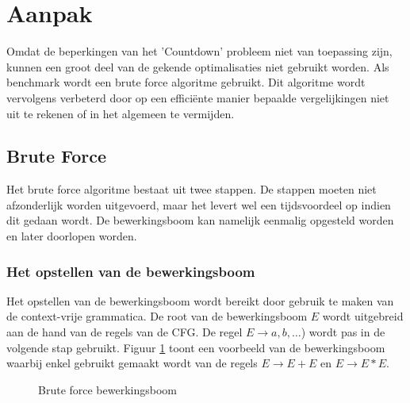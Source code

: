 \documentclass[Main.tex]{subfiles}
\begin{document}
\section{Aanpak}
Omdat de beperkingen van het 'Countdown' probleem niet van toepassing zijn, kunnen een groot deel van de gekende optimalisaties niet gebruikt worden. Als benchmark wordt een brute force algoritme gebruikt. Dit algoritme wordt vervolgens verbeterd door op een effici\"ente manier bepaalde vergelijkingen niet uit te rekenen of in het algemeen te vermijden.
\subsection{Brute Force}
Het brute force algoritme bestaat uit twee stappen. De stappen moeten niet afzonderlijk worden uitgevoerd, maar het levert wel een tijdsvoordeel op indien dit gedaan wordt. De bewerkingsboom kan namelijk eenmalig opgesteld worden en later doorlopen worden.
\subsubsection*{Het opstellen van de bewerkingsboom}
Het opstellen van de bewerkingsboom wordt bereikt door gebruik te maken van de context-vrije grammatica. De root van de bewerkingsboom $E$ wordt uitgebreid aan de hand van de regels van de CFG. De regel $E \rightarrow a,b,\dotsc$) wordt pas in de volgende stap gebruikt. Figuur \ref{fig:bewerkingsboom} toont een voorbeeld van de bewerkingsboom waarbij enkel gebruikt gemaakt wordt van de regels $E \rightarrow E+E$ en $E \rightarrow E \ast E$.
\begin{figure}[!htb]
\centering
{}
\caption{Brute force bewerkingsboom} \label{fig:bewerkingsboom}
\end{figure}
\end{document}
